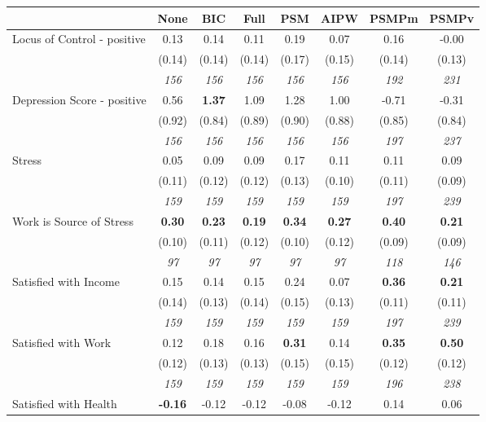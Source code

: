 \begin{tabular}{l c c c c c c c}
\toprule
 & None & BIC & Full & PSM & AIPW & PSMPm & PSMPv \\
\midrule
Locus of Control - positive & 0.13 & 0.14 & 0.11 & 0.19 & 0.07 & 0.16 & -0.00 \\
& (0.14) & (0.14) & (0.14) & (0.17) & (0.15) & (0.14) & (0.13) \\
& \textit{ 156 } & \textit{ 156 } & \textit{ 156 } & \textit{ 156 } & \textit{ 156 } & \textit{ 192 } & \textit{ 231 } \\
Depression Score - positive & 0.56 & \textbf{ 1.37 } & 1.09 & 1.28 & 1.00 & -0.71 & -0.31 \\
& (0.92) & (0.84) & (0.89) & (0.90) & (0.88) & (0.85) & (0.84) \\
& \textit{ 156 } & \textit{ 156 } & \textit{ 156 } & \textit{ 156 } & \textit{ 156 } & \textit{ 197 } & \textit{ 237 } \\
Stress & 0.05 & 0.09 & 0.09 & 0.17 & 0.11 & 0.11 & 0.09 \\
& (0.11) & (0.12) & (0.12) & (0.13) & (0.10) & (0.11) & (0.09) \\
& \textit{ 159 } & \textit{ 159 } & \textit{ 159 } & \textit{ 159 } & \textit{ 159 } & \textit{ 197 } & \textit{ 239 } \\
Work is Source of Stress & \textbf{ 0.30 } & \textbf{ 0.23 } & \textbf{ 0.19 } & \textbf{0.34} & \textbf{0.27} & \textbf{0.40} & \textbf{0.21} \\
& (0.10) & (0.11) & (0.12) & (0.10) & (0.12) & (0.09) & (0.09) \\
& \textit{ 97 } & \textit{ 97 } & \textit{ 97 } & \textit{ 97 } & \textit{ 97 } & \textit{ 118 } & \textit{ 146 } \\
Satisfied with Income & 0.15 & 0.14 & 0.15 & 0.24 & 0.07 & \textbf{0.36} & \textbf{0.21} \\
& (0.14) & (0.13) & (0.14) & (0.15) & (0.13) & (0.11) & (0.11) \\
& \textit{ 159 } & \textit{ 159 } & \textit{ 159 } & \textit{ 159 } & \textit{ 159 } & \textit{ 197 } & \textit{ 239 } \\
Satisfied with Work & 0.12 & 0.18 & 0.16 & \textbf{0.31} & 0.14 & \textbf{0.35} & \textbf{0.50} \\
& (0.12) & (0.13) & (0.13) & (0.15) & (0.15) & (0.12) & (0.12) \\
& \textit{ 159 } & \textit{ 159 } & \textit{ 159 } & \textit{ 159 } & \textit{ 159 } & \textit{ 196 } & \textit{ 238 } \\
Satisfied with Health & \textbf{ -0.16 } & -0.12 & -0.12 & -0.08 & -0.12 & 0.14 & 0.06 \\

\end{tabular}
